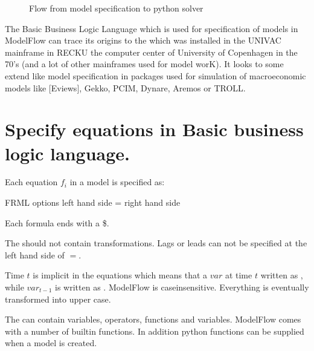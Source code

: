 \documentclass[letterpaper,10pt,english]{jupyterBook}
\let\sphinxpxdimen\pdfpxdimen\else\newdimen\sphinxpxdimen
\begin{document}
\begin{figure}[htbp]
\centering
\capstart

\noindent\sphinxincludegraphics[width=700\sphinxpxdimen]{{onboarding}.png}
\caption{Flow from model specification to python solver}\label{\detokenize{content/notebooks/intro/model specification:markdown-fig}}\end{figure}

\sphinxAtStartPar
The Basic Business Logic Language which is used for specification of models in ModelFlow can trace its origins to the  which was installed in the UNIVAC mainframe in RECKU \sphinxhyphen{} the computer center of University of Copenhagen in the 70’s (and a lot of other mainframes used for model worK). It looks to some extend like model specification in packages used for simulation of macroeconomic models like  {[}Eviews{]}, Gekko, PCIM, Dynare, Aremos or TROLL.


\section{Specify equations in Basic business logic language.}
\label{\detokenize{content/notebooks/intro/model specification:specify-equations-in-basic-business-logic-language}}
\sphinxAtStartPar
Each equation \(f_i\) in a model is specified as:

\begin{sphinxVerbatim}[commandchars=\\\{\}]
FRML \PYGZlt{}options\PYGZgt{} \PYGZlt{}left hand side\PYGZgt{} = \PYGZlt{}right hand side\PYGZgt{} \PYGZdl{}
\end{sphinxVerbatim}

\sphinxAtStartPar
Each formula ends with a \$.

\sphinxAtStartPar
The  should not contain transformations. Lags or leads can not be specified at the left hand side of \(=\).

\sphinxAtStartPar
Time \(t\) is implicit in the equations which means that a \(var\) at time \(t\) written as , while \(var_{t-1}\) is written as . ModelFlow is case\sphinxhyphen{}insensitive. Everything is eventually transformed into upper case.

\sphinxAtStartPar
The  can contain variables, operators, functions and variables. ModelFlow comes with a number of built\sphinxhyphen{}in functions. In addition python functions can be supplied when a model is created.
\end{document}
